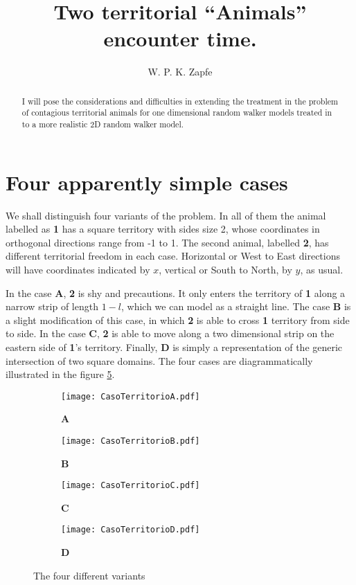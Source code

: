 \documentclass[letterpaperr,12pt]{article}
\title{Two territorial ``Animals'' encounter time.}
\author{W. P. K. Zapfe}
\newcommand{\Acase}{\textbf{A}\xspace}
\newcommand{\Bcase}{\textbf{B}\xspace}
\newcommand{\Ccase}{\textbf{C}\xspace}
\newcommand{\Dcase}{\textbf{D}\xspace}
\newcommand{\Uno}{\textbf{1}\xspace}
\newcommand{\Dos}{\textbf{2}\xspace}
\begin{document}
\maketitle

\begin{abstract}

I will pose the considerations and difficulties in extending the 
treatment in the problem of contagious territorial animals for one dimensional 
random walker models treated in \cite{LucaDavid} to a more
realistic 2D random walker model. 

\end{abstract}


\section{Four apparently simple cases}

We shall distinguish four variants of the problem. In all
of them the animal labelled as \Uno has a square territory
with sides size 2, whose coordinates in orthogonal directions
range from -1 to 1. The second animal, labelled \Dos, has
different territorial freedom in each case.
Horizontal or West to East directions will have
coordinates indicated by $x$, vertical or South to North, by
$y$, as usual. 

In the case \Acase, \Dos is shy and precautions. It only
enters the territory of \Uno along a narrow strip of
length $1-l$, which we can model as
a straight line. The case \Bcase is a slight modification of 
this case, in which \Dos is able to cross \Uno territory 
from side to side. In the case \Ccase, \Dos is able to move
along a two dimensional strip on the eastern side of \Uno's
territory. Finally, \Dcase is simply a representation
of the generic intersection of two square domains.
The four cases are diagrammatically illustrated in the 
 figure \ref{fig::casos}. 

\begin{figure}[h]
  \centering
  \begin{subfigure}[b]{0.45\textwidth}
    \centering
    \texttt{[image: CasoTerritorioA.pdf]}
    \caption{\Acase}
    \label{figAcase}
  \end{subfigure}
  \begin{subfigure}[b]{0.45\textwidth}
    \centering
    \texttt{[image: CasoTerritorioB.pdf]}
    \caption{\Bcase}
    \label{figBcase}
  \end{subfigure}

  \begin{subfigure}[b]{0.45\textwidth}
    \centering
    \texttt{[image: CasoTerritorioC.pdf]}
    \caption{\Ccase}
    \label{figCcase}
  \end{subfigure}
  \begin{subfigure}[b]{0.45\textwidth}
    \centering
    \texttt{[image: CasoTerritorioD.pdf]}
    \caption{\Dcase}
    \label{figDcase}
  \end{subfigure}
  \caption{The four different variants}\label{fig::casos}
\end{figure}
\end{document}
